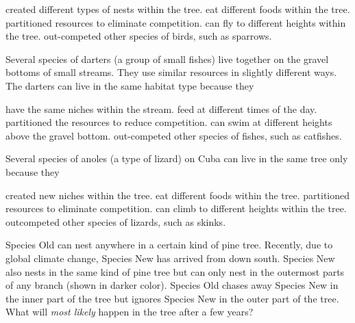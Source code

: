 \begin{choices}
	\choice created different types of nests within the tree.%
	\choice eat different foods within the tree.%
	\correctchoice partitioned resources to eliminate competition.%
	\choice can fly to different heights within the tree.%
	\choice out-competed other species of birds, such as sparrows.%
\end{choices}

\question
Several species of darters (a group of small fishes) live together on the gravel bottoms of small streams. They use similar resources in slightly different ways. The darters can live in the same habitat type  because they

\begin{choices}
	\choice have the same niches within the stream.%
	\choice feed at different times of the day.%
	\correctchoice partitioned the resources to reduce competition.%
	\choice can swim at different heights above the gravel bottom.%
	\choice out-competed other species of fishes, such as catfishes.%
\end{choices}

\question
Several species of anoles (a type of lizard) on Cuba can live in the same tree only because they

\begin{choices}
	\choice created new niches within the tree.%
	\choice eat different foods within the tree.%
	\correctchoice partitioned resources to eliminate competition.%
	\choice can climb to different heights within the tree.%
	\choice outcompeted other species of lizards, such as skinks.%
\end{choices}

\question
Species Old can nest anywhere in a certain kind of pine tree. Recently, due to global climate change, Species New has arrived from down south. Species New also nests in the same kind of pine tree but can only nest in the outermost parts of any branch (shown in darker color).  Species Old chases away Species New in the inner part of the tree but ignores Species New in the outer part of the tree. What will \emph{most likely} happen in the tree after a few years?

